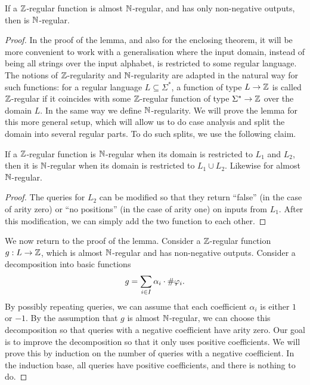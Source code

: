         \begin{lemma}\label{lem:remove-almost}
            If a  ${\mathbb Z}$-regular function  is almost ${\mathbb N}$-regular, and has only non-negative outputs, then  is ${\mathbb N}$-regular.
    \end{lemma}
    \begin{proof}
        In the proof of the lemma, and also for the enclosing theorem, it will be more convenient to work with a generalisation where the input domain, instead of being  all strings over the input alphabet, is restricted to  some regular language. The notions of ${\mathbb Z}$-regularity and ${\mathbb N}$-regularity are adapted in the natural way for such functions: for a regular language $L \subseteq \Sigma^*$, a function of type  $ L \to {\mathbb Z}$ is called ${\mathbb Z}$-regular if it coincides with some ${\mathbb Z}$-regular function of type $ \Sigma^* \to {\mathbb Z}$ over the domain $L$. In the same way we define ${\mathbb N}$-regularity. We will prove the lemma for this more general setup, which will allow us to do case analysis and split the domain into several regular parts. To do such splits, we use the following claim.


    \begin{claim}\label{claim:aggregate-two-domains} If a ${\mathbb Z}$-regular function  is  ${\mathbb N}$-regular when its domain is restricted to $L_1$ and $L_2$, then it is  ${\mathbb N}$-regular when its domain is restricted to $L_1 \cup L_2$. Likewise for almost ${\mathbb N}$-regular.
    \end{claim}
    \begin{proof}
        The queries for $L_2$ can be modified so that they return ``false'' (in the case of arity zero) or ``no positions'' (in the case of arity one) on inputs from $L_1$. After this modification, we can simply add the two function to each other.
    \end{proof}

     We now return to the proof of the lemma.  
         Consider a ${\mathbb Z}$-regular function $g : L \to {\mathbb Z}$, which is almost ${\mathbb N}$-regular and has non-negative outputs. Consider  a decomposition into basic functions 
        \begin{align*}
        g = \sum_{i \in I} \alpha_i \cdot \#{\varphi_i}.
        \end{align*}
        By possibly repeating queries, we can assume that each coefficient $\alpha_i$ is either $1$ or $-1$. By the assumption that $g$ is almost ${\mathbb N}$-regular, we can choose this decomposition so that queries with a negative coefficient have arity zero. Our goal is to improve the decomposition so that it only uses positive coefficients. We will prove this by induction on the number of queries with a negative coefficient. In the induction base, all queries have positive coefficients, and there is nothing to do.


\end{proof}
